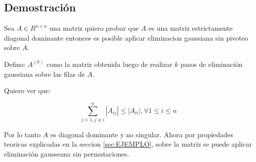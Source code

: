 \subsection{Demostración}
Sea $A \in R^{n \times n}$ una matriz quiero probar que $A$ es una matriz estrictamente diagonal dominante entonces es posible aplicar eliminacion gaussiana sin pivoteo sobre $A$.

Defino: $A^{(k)}$ como la matriz obtenida luego de realizar $k$ pasos de eliminación gaussiana sobre las filas de $A$.

Quiero ver que:

\[
\sum_{j = 1, j \neq i }^{n}|A_{ij}| \leq  |A_{ii}|,  \forall  1 \leq  i \leq n
\]

Por lo tanto $A$ es diagonal dominante y no singular. Ahora por propiedades teoricas explicadas en la seccion \ref{sec:EJEMPLO}, sobre la matriz se puede aplicar eliminación gausseana sin permutaciones.


